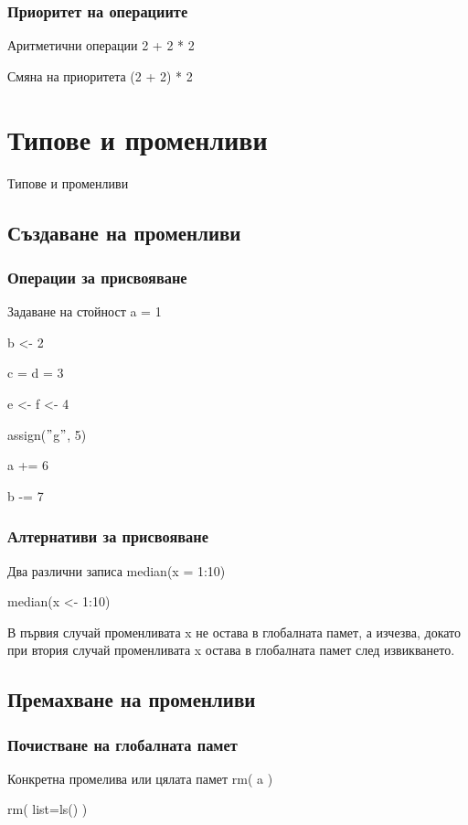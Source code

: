 \documentclass{beamer}
\begin{document}
\begin{frame}
\frametitle{Приоритет на операциите}
\begin{block}{Аритметични операции}
2 + 2 * 2
\end{block}
\begin{block}{Смяна на приоритета}
(2 + 2) * 2
\end{block}
\end{frame}

\section{Типове и променливи}

\begin{frame}
\center \huge{Типове и променливи}
\end{frame}

\subsection{Създаване на променливи}

\begin{frame}
\frametitle{Операции за присвояване}
\begin{block}{Задаване на стойност}
a = 1

b <- 2

c = d = 3

e <- f <- 4

assign($"$g$"$, 5)

a += 6

b -= 7
\end{block}
\end{frame}

\begin{frame}
\frametitle{Алтернативи за присвояване}
\begin{block}{Два различни записа}
median(x = 1:10)

median(x <- 1:10)
\end{block}

В първия случай променливата x не остава в глобалната памет, а изчезва, докато при втория случай променливата x остава в глобалната памет след извикването.
\end{frame}

\subsection{Премахване на променливи}

\begin{frame}
\frametitle{Почистване на глобалната памет}
\begin{block}{Конкретна промелива или цялата памет}
rm( a )

rm( list=ls() )
\end{block}
\end{frame}
\end{document}
